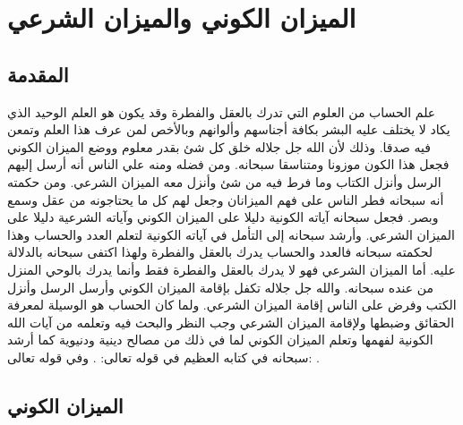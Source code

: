 \chapter{الميزان الكوني والميزان الشرعي}

\section{المقدمة}

علم الحساب من العلوم التي تدرك بالعقل والفطرة وقد يكون هو العلم الوحيد الذي يكاد لا يختلف عليه البشر بكافة أجناسهم وألوانهم وبالأخص لمن عرف هذا العلم وتمعن فيه صدقا. وذلك لأن الله جل جلاله خلق كل شئ بقدر معلوم ووضع الميزان الكوني فجعل هذا الكون موزونا ومتناسقا سبحانه. ومن فضله ومنه علي الناس أنه أرسل إليهم الرسل وأنزل الكتاب وما فرط فيه من شئ وأنزل معه الميزان الشرعي. ومن حكمته أنه سبحانه فطر الناس على فهم الميزانان وجعل لهم كل ما يحتاجونه من عقل وسمع وبصر. فجعل سبحانه آياته الكونية دليلا على الميزان الكوني وآياته الشرعية دليلا على الميزان الشرعي. وأرشد سبحانه إلى التأمل في آياته الكونية لتعلم العدد والحساب وهذا لحكمته سبحانه فالعدد والحساب يدرك بالعقل والفطرة ولهذا اكتفى سبحانه بالدلالة عليه. أما الميزان الشرعي فهو لا يدرك بالعقل والفطرة فقط وأنما يدرك بالوحي المنزل من عنده سبحانه. والله جل جلاله تكفل بإقامة الميزان الكوني وأرسل الرسل وأنزل الكتب وفرض على الناس إقامة الميزان الشرعي. ولما كان الحساب هو الوسيلة لمعرفة الحقائق وضبطها ولإقامة الميزان الشرعي وجب النظر والبحث فيه وتعلمه من آيات الله الكونية لفهمها وتعلم الميزان الكوني لما في ذلك من مصالح دينية ودنيوية كما أرشد سبحانه في  كتابه العظيم في قوله تعالى: \quranayah*[10][5]{\footnotesize \surahname*[10]}. وفي قوله تعالى:
\quranayah*[17][12]{\footnotesize \surahname*[17]}.

\section{الميزان الكوني}

